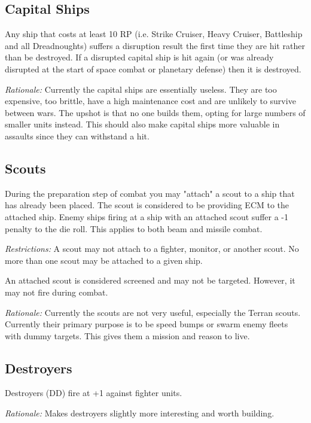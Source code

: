 \subsection{Capital Ships}

Any ship that costs at least 10 RP (i.e. Strike Cruiser, Heavy Cruiser, Battleship and all Dreadnoughts) suffers a disruption result the first time they are hit rather than be destroyed. If a disrupted capital ship is hit again (or was already disrupted at the start of space combat or planetary defense) then it is destroyed.

\textit{Rationale:} Currently the capital ships are essentially useless. They are too expensive, too brittle, have a high maintenance cost and are unlikely to survive between wars. The upshot is that no one builds them, opting for large numbers of smaller units instead. This should also make capital ships more valuable in assaults since they can withstand a hit.

\subsection{Scouts}

During the preparation step of combat you may "attach" a scout to a ship that has already been placed. The scout is considered to be providing ECM to the attached ship. Enemy ships firing at a ship with an attached scout suffer a -1 penalty to the die roll. This applies to both beam and missile combat.

\textit{Restrictions:} A scout may not attach to a fighter, monitor, or another scout. No more than one scout may be attached to a given ship.

An attached scout is considered screened and may not be targeted. However, it may not fire during combat.

\textit{Rationale:} Currently the scouts are not very useful, especially the Terran scouts. Currently their primary purpose is to be speed bumps or swarm enemy fleets with dummy targets. This gives them a mission and reason to live.

\subsection{Destroyers}

Destroyers (DD) fire at +1 against fighter units.

\textit{Rationale:} Makes destroyers slightly more interesting and worth building.

